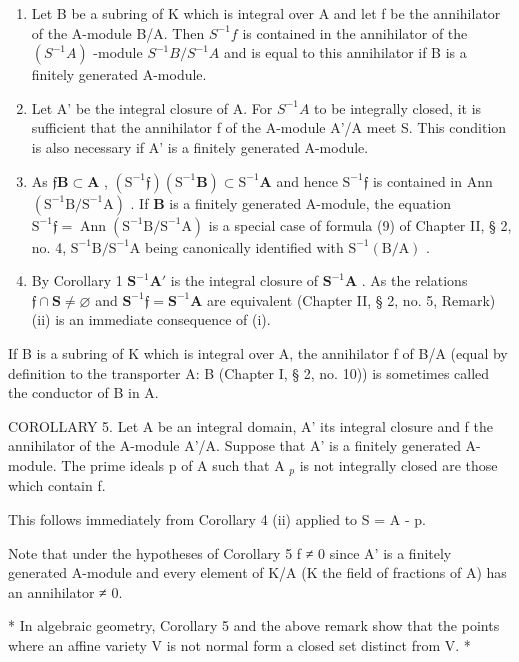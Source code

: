 \begin{enumerate}
\def\labelenumi{(\roman{enumi})}
\item
  Let B be a subring of K which is integral over A and let f be the annihilator of the A-module B/A. Then \(S^{-1}f\) is contained in the annihilator of the \((S^{-1}A)\) -module \(S^{-1}B/S^{-1}A\) and is equal to this annihilator if B is a finitely generated A-module.
\item
  Let A' be the integral closure of A. For \(S^{-1}A\) to be integrally closed, it is sufficient that the annihilator f of the A-module A'/A meet S. This condition is also necessary if A' is a finitely generated A-module.
\setcounter{enumi}{0}
\item
  As \(\mathfrak{f}\mathbf{B} \subset \mathbf{A}\) , \((\mathrm{S}^{-1}\mathfrak{f})(\mathrm{S}^{-1}\mathbf{B}) \subset \mathrm{S}^{-1}\mathbf{A}\) and hence \(\mathrm{S}^{-1}\mathfrak{f}\) is contained in Ann \((\mathrm{S}^{-1}\mathrm{B} / \mathrm{S}^{-1}\mathrm{A})\) . If \(\mathbf{B}\) is a finitely generated A-module, the equation \(\mathrm{S}^{-1}\mathfrak{f} = \operatorname{Ann}(\mathrm{S}^{-1}\mathrm{B} / \mathrm{S}^{-1}\mathrm{A})\) is a special case of formula (9) of Chapter II, § 2, no. 4, \(\mathrm{S}^{-1}\mathrm{B} / \mathrm{S}^{-1}\mathrm{A}\) being canonically identified with \(\mathrm{S}^{-1}(\mathrm{B} / \mathrm{A})\) .
\item
  By Corollary 1 \(\mathbf{S}^{-1}\mathbf{A}'\) is the integral closure of \(\mathbf{S}^{-1}\mathbf{A}\) . As the relations \(\mathfrak{f} \cap \mathbf{S} \neq \varnothing\) and \(\mathbf{S}^{-1}\mathfrak{f} = \mathbf{S}^{-1}\mathbf{A}\) are equivalent (Chapter II, § 2, no. 5, Remark) (ii) is an immediate consequence of (i).
\end{enumerate}

If B is a subring of K which is integral over A, the annihilator f of B/A (equal by definition to the transporter A: B (Chapter I, § 2, no. 10)) is sometimes called the conductor of B in A.

COROLLARY 5. Let A be an integral domain, A' its integral closure and f the annihilator of the A-module A'/A. Suppose that A' is a finitely generated A-module. The prime ideals p of A such that A \(_{p}\) is not integrally closed are those which contain f.

This follows immediately from Corollary 4 (ii) applied to S = A - p.

Note that under the hypotheses of Corollary 5 f ≠ 0 since A' is a finitely generated A-module and every element of K/A (K the field of fractions of A) has an annihilator ≠ 0.

* In algebraic geometry, Corollary 5 and the above remark show that the points where an affine variety V is not normal form a closed set distinct from V. *

